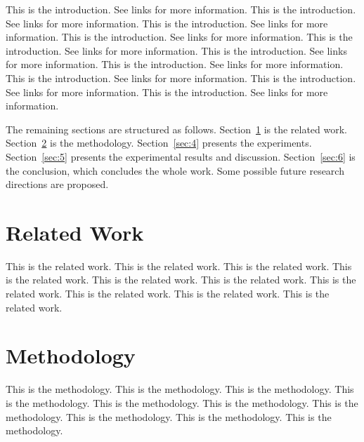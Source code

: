 \documentclass[conference,compsoc]{IEEEtran}
\begin{document}
This is the introduction. See links \cite{liu2024efficient, yang2026builder, yang2025checker} for more information. This is the introduction. See links \cite{liu2024efficient, yang2026builder, yang2025checker} for more information. This is the introduction. See links \cite{liu2024efficient, yang2026builder, yang2025checker} for more information. This is the introduction. See links \cite{liu2024efficient, yang2026builder, yang2025checker} for more information. This is the introduction. See links \cite{liu2024efficient, yang2026builder, yang2025checker} for more information. This is the introduction. See links \cite{liu2024efficient, yang2026builder, yang2025checker} for more information. This is the introduction. See links \cite{liu2024efficient, yang2026builder, yang2025checker} for more information. This is the introduction. See links \cite{liu2024efficient, yang2026builder, yang2025checker} for more information. This is the introduction. See links \cite{liu2024efficient, yang2026builder, yang2025checker} for more information. This is the introduction. See links \cite{liu2024efficient, yang2026builder, yang2025checker} for more information. 

The remaining sections are structured as follows. Section~\ref{sec:2} is the related work. Section~\ref{sec:3} is the methodology. Section~\ref{sec:4} presents the experiments. Section~\ref{sec:5} presents the experimental results and discussion. Section~\ref{sec:6} is the conclusion, which concludes the whole work. Some possible future research directions are proposed. 

\section{Related Work}
\label{sec:2}

This is the related work. This is the related work. This is the related work. This is the related work. This is the related work. This is the related work. This is the related work. This is the related work. This is the related work. This is the related work. 

\section{Methodology}
\label{sec:3}

This is the methodology. This is the methodology. This is the methodology. This is the methodology. This is the methodology. This is the methodology. This is the methodology. This is the methodology. This is the methodology. This is the methodology. 
\end{document}
